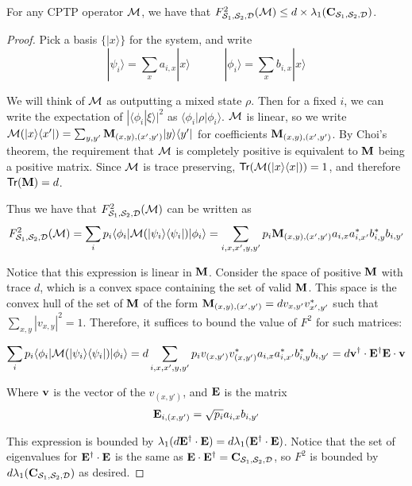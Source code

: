 \begin{theorem}[No-Conversion]\label{thm:noconv} For any CPTP operator ${\mathcal{M}}$, we have that $F^2_{{\mathcal{S}}_1,{\mathcal{S}}_2,{\mathcal{D}}}({\mathcal{M}})\leq d\times \lambda_1({\mathbf{C}}_{{\mathcal{S}}_1,{\mathcal{S}}_2,{\mathcal{D}}})$. \end{theorem}

\begin{proof} Pick a basis $\{|x\rangle\}$ for the system, and write 
\[	|\psi_i\rangle=\sum_x a_{i,x}|x\rangle \;\;\;\;\;\;\;\;\;\;\; |\phi_i\rangle=\sum_x b_{i,x}|x\rangle\]

We will think of ${\mathcal{M}}$ as outputting a mixed state $\rho$.  Then for a fixed $i$, we can write the expectation of $|\langle \phi_i | \xi \rangle |^2$ as $\langle \phi_i|\rho|\phi_i\rangle$.  ${\mathcal{M}}$ is linear, so we write ${\mathcal{M}}(|x\rangle\langle x'|)=\sum_{y,y'}{\mathbf{M}}_{(x,y),(x',y')} |y\rangle\langle y'|$ for coefficients ${\mathbf{M}}_{(x,y),(x',y')}$.  By Choi's theorem, the requirement that ${\mathcal{M}}$ is completely positive is equivalent to ${\mathbf{M}}$ being a positive matrix.  Since ${\mathcal{M}}$ is trace preserving, ${\sf Tr}({\mathcal{M}}(|x\rangle\langle x|))=1$, and therefore ${\sf Tr}({\mathbf{M}})=d$.  

Thus we have that $F^2_{{\mathcal{S}}_1,{\mathcal{S}}_2,{\mathcal{D}}}({\mathcal{M}})$ can be written as 
\[F^2_{{\mathcal{S}}_1,{\mathcal{S}}_2,{\mathcal{D}}}({\mathcal{M}})=\sum_i p_i \langle \phi_i |{\mathcal{M}}(|\psi_i\rangle\langle\psi_i|)|\phi_i\rangle=\sum_{i,x,x',y,y'}p_i {\mathbf{M}}_{(x,y),(x',y')}a_{i,x}a_{i,x'}^* b_{i,y}^* b_{i,y'}\]

Notice that this expression is linear in ${\mathbf{M}}$.  Consider the space of positive ${\mathbf{M}}$ with trace $d$, which is a convex space containing the set of valid ${\mathbf{M}}$.  This space is the convex hull of the set of ${\mathbf{M}}$ of the form ${\mathbf{M}}_{(x,y),(x',y')}=d v_{x,y'}v^*_{x',y'}$ such that $\sum_{x,y}|v_{x,y}|^2=1$.  Therefore, it suffices to bound the value of $F^2$ for such matrices:

\[\sum_i p_i \langle \phi_i |{\mathcal{M}}(|\psi_i\rangle\langle\psi_i|)|\phi_i\rangle=d\sum_{i,x,x',y,y'}p_i v_{(x,y')}v^*_{(x,y')}a_{i,x}a_{i,x'}^* b_{i,y}^* b_{i,y'}=d{\mathbf{v}}^\dagger\cdot{\mathbf{E}}^\dagger{\mathbf{E}}\cdot{\mathbf{v}}\]

Where ${\mathbf{v}}$ is the vector of the $v_{(x,y')}$, and ${\mathbf{E}}$ is the matrix \[{\mathbf{E}}_{i,(x,y')}=\sqrt{p_i}a_{i,x}b_{i,y'} \]

This expression is bounded by $\lambda_1(d{\mathbf{E}}^\dagger\cdot{\mathbf{E}})=d \lambda_1({\mathbf{E}}^\dagger\cdot{\mathbf{E}})$.  Notice that the set of eigenvalues for ${\mathbf{E}}^\dagger\cdot{\mathbf{E}}$ is the same as ${\mathbf{E}}\cdot{\mathbf{E}}^\dagger={\mathbf{C}}_{{\mathcal{S}}_1,{\mathcal{S}}_2,{\mathcal{D}}}$, so $F^2$ is bounded by $d\lambda_1({\mathbf{C}}_{{\mathcal{S}}_1,{\mathcal{S}}_2,{\mathcal{D}}})$ as desired.  \end{proof}

